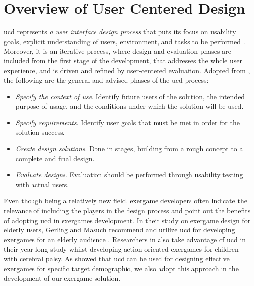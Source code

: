 \section{Overview of User Centered Design}
\gls{ucd} represents \textit{a user interface design process} that puts its focus on usability goals, explicit understanding of users, environment, and tasks to be performed \cite{ucd2}. Moreover, it is an iterative process, where design and evaluation phases are included from the first stage of the development, that addresses the whole user experience, and is driven and refined by user-centered evaluation. %
Adopted from \cite{userCenteredDesign}, the following are the general and advised phases of the \acrshort{ucd} process:
\begin{itemize}
\item \textit{Specify the context of use}. Identify future users of the solution, the intended purpose of usage, and the conditions under which the solution will be used.
\item \textit{Specify requirements}. Identify user goals that must be met in order for the solution success.
\item \textit{Create design solutions}. Done in stages, building from a rough concept to a complete and final design.
\item \textit{Evaluate designs}. Evaluation should be performed through usability testing with actual users.
\end{itemize}
Even though being a relatively new field, exergame developers often indicate the relevance of including the players in the design process and point out the benefits of adopting \acrshort{ucd} in exergames development. In their study on exergame design for elderly users, Gerling and Masuch recommend and utilize \acrshort{ucd} for developing exergames for an elderly audience \cite{webster2014systematic}. Researchers in \cite{hernandez2013designing} also take advantage of \acrshort{ucd} in their year long study whilst developing action-oriented exergames for children with cerebral palsy. As showed that \acrshort{ucd} can be used for designing effective exergames for specific target demographic, we also adopt this approach in the development of our exergame solution.
